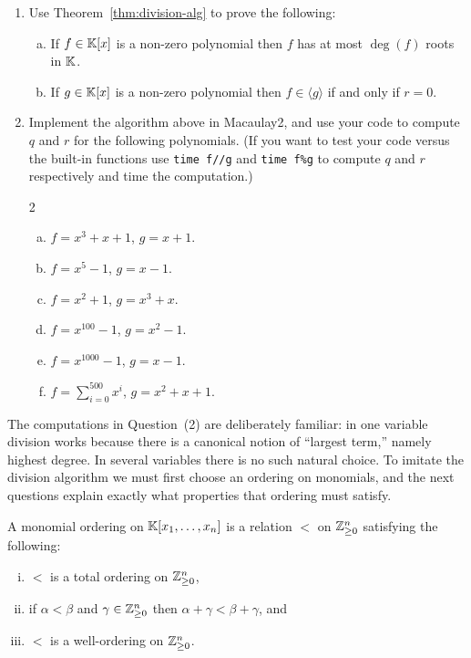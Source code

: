 \documentclass[12pt,reqno]{amsart}
\begin{document}
\begin{enumerate}[leftmargin=*]
\item Use Theorem~\ref{thm:division-alg} to prove the following:
\begin{enumerate}[(a)]
	\item If $f\in \mathbb{K}[x]$ is a non-zero polynomial then $f$ has at most $\deg(f)$ roots in $\mathbb{K}$.
	\item If $g\in \mathbb{K}[x]$ is a non-zero polynomial then $f \in \langle g \rangle$ if and only if $r=0$. 
\end{enumerate}

\item Implement the algorithm above in Macaulay2, and use your code to compute $q$ and $r$ for the following polynomials. (If you want to test your code versus the built-in functions use \verb|time f//g| and \verb|time f%g| to compute $q$ and $r$ respectively and time the computation.)
\begin{multicols}{2}
\begin{enumerate}[(a)]
	\item $f = x^3 + x + 1$, \quad $g = x + 1$.
	\item $f = x^5 - 1$, \quad $g = x - 1$.
	\item $f = x^2 + 1$, \quad $g = x^3 + x$.
	\item $f = x^{100} - 1$, \quad $g = x^2 - 1$.
	\item $f = x^{1000} - 1$, \quad $g = x - 1$.
	\item $f = \sum_{i=0}^{500} x^i$, \quad $g = x^2 + x + 1$.
\end{enumerate}
\end{multicols}
\end{enumerate}

\hrulefill 

The computations in Question~(2) are deliberately familiar: in one variable division works because there is a canonical notion of ``largest term,'' namely highest degree. In several variables there is no such natural choice. To imitate the division algorithm we must first choose an ordering on monomials, and the next questions explain exactly what properties that ordering must satisfy.

\begin{definition}
A monomial ordering on $\mathbb{K}[x_1,\ldots,x_n]$ is a relation $<$ on $\mathbb{Z}^{n}_{\geq0}$ satisfying the following:
\begin{enumerate}[(i)]
\item $<$ is a total ordering on $\mathbb{Z}^{n}_{\geq0}$,
\item if $\alpha < \beta$ and $\gamma \in \mathbb{Z}^{n}_{\geq0}$ then $\alpha+\gamma < \beta + \gamma$, and
\item $<$ is a well-ordering on $\mathbb{Z}^{n}_{\geq0}$.
\end{enumerate}
\end{definition}
\end{document}
